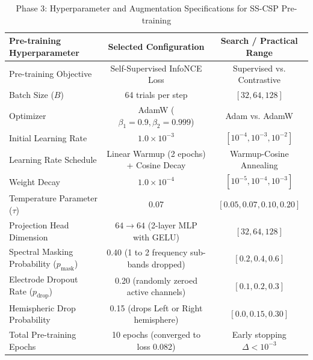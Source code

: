 \begin{table}[t]
\centering
\caption{Phase 3: Hyperparameter and Augmentation Specifications for SS-CSP Pre-training}
\label{tab:phase3_pretraining}
\begin{tabular}{lcc}
\hline
\textbf{Pre-training Hyperparameter} & \textbf{Selected Configuration} & \textbf{Search / Practical Range} \\
\hline
Pre-training Objective & Self-Supervised InfoNCE Loss & Supervised vs. Contrastive \\
Batch Size ($B$) & 64 trials per step & $[32, 64, 128]$ \\
Optimizer & AdamW ($\beta_1=0.9, \beta_2=0.999$) & Adam vs. AdamW \\
Initial Learning Rate & $1.0 \times 10^{-3}$ & $[10^{-4}, 10^{-3}, 10^{-2}]$ \\
Learning Rate Schedule & Linear Warmup (2 epochs) + Cosine Decay & Warmup-Cosine Annealing \\
Weight Decay & $1.0 \times 10^{-4}$ & $[10^{-5}, 10^{-4}, 10^{-3}]$ \\
Temperature Parameter ($\tau$) & 0.07 & $[0.05, 0.07, 0.10, 0.20]$ \\
Projection Head Dimension & $64 \rightarrow 64$ (2-layer MLP with GELU) & $[32, 64, 128]$ \\
Spectral Masking Probability ($p_{\text{mask}}$) & 0.40 (1 to 2 frequency sub-bands dropped) & $[0.2, 0.4, 0.6]$ \\
Electrode Dropout Rate ($p_{\text{drop}}$) & 0.20 (randomly zeroed active channels) & $[0.1, 0.2, 0.3]$ \\
Hemispheric Drop Probability & 0.15 (drops Left or Right hemisphere) & $[0.0, 0.15, 0.30]$ \\
Total Pre-training Epochs & 10 epochs (converged to loss 0.082) & Early stopping $\Delta < 10^{-3}$ \\
\hline
\end{tabular}
\end{table}